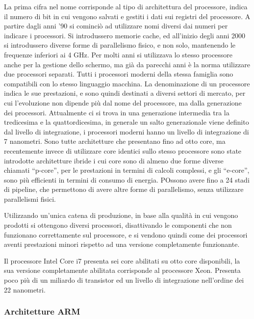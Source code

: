 \documentclass{article}
\numberwithin{equation}{subsection}
\begin{document}
La prima cifra nel nome corrisponde al tipo di architettura del processore, indica il numero di bit in cui vengono salvati e gestiti i dati sui registri del processore. 
A partire dagli anni '90 si cominciò ad utilizzare nomi diversi dai numeri per indicare i processori. Si introdussero memorie cache, ed all'inizio degli anni 2000 si introdussero 
diverse forme di parallelismo fisico, e non solo, mantenendo le frequenze inferiori ai 4 GHz. Per molti anni si utilizzava lo stesso processore anche per la gestione 
dello schermo, ma già da parecchi anni è la norma utilizzare due processori separati. 
Tutti i processori moderni della stessa famiglia sono compatibili con lo stesso linguaggio macchina. La denominazione di un processore indica le sue prestazioni, e sono 
quindi destinati a diversi settori di mercato, per cui l'evoluzione non dipende più dal nome del processore, ma dalla generazione dei processori. Attualmente ci si trova 
in una generazione intermedia tra la tredicesima e la quattordicesima, in generale un salto generazionale viene definito dal livello di integrazione, i processori moderni 
hanno un livello di integrazione di 7 nanometri. 
Sono tutte architetture che presentano fino ad otto core, ma recentemente invece di utilizzare core identici sullo stesso processore sono state introdotte architetture ibride 
i cui core sono di almeno due forme diverse chiamati ``p-core'', per le prestazioni in termini di calcoli complessi, e gli ``e-core'', sono più efficienti in termini di consumo 
di energia. POssono avere fino a 24 stadi di pipeline, che permettono di avere altre forme di parallelismo, senza utilizzare parallelismi fisici. 

Utilizzando un'unica catena di produzione, in base alla qualità in cui vengono prodotti si ottengono diversi processori, disattivando le componenti che non funzionano 
correttamente sul processore, e si vendono quindi come dei processori aventi prestazioni minori rispetto ad una versione completamente funzionante. 

Il processore Intel Core i7 presenta sei core abilitati su otto core disponibili, la sua versione completamente abilitata corrisponde al processore Xeon. Presenta poco più di 
un miliardo di transistor ed un livello di integrazione nell'ordine dei 22 nanometri. 


\subsubsection{Architetture ARM}
\end{document}
